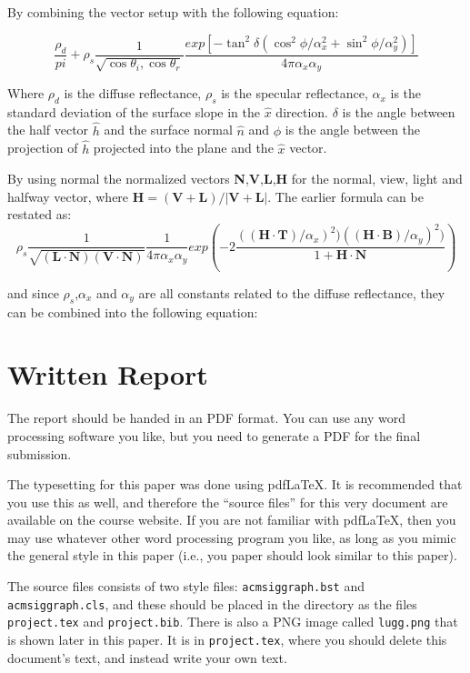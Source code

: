 \documentclass{acmsiggraph}               %
\begin{document}
By combining the vector setup with the following equation:

\begin{equation}
  \frac{\rho_d}{pi} + \rho_s \frac{1}{\sqrt{\cos{\theta_i},\cos{\theta_r}}}
  \frac{exp[-\tan^2\delta(\cos^2\phi/\alpha_x^2 +
  \sin^2\phi/\alpha_y^2)]}{4\pi\alpha_x\alpha_y}
\end {equation}

Where $\rho_d$ is the diffuse reflectance, $\rho_s$ is the specular
reflectance, $\alpha_x$ is the standard deviation of the surface slope in the
$\hat{x}$ direction. $\delta$ is the angle between the half vector $\hat{h}$
and the surface normal $\hat{n}$ and $\phi$ is the angle between the projection
of $\hat{h}$ projected into the plane and the $\hat{x}$ vector.

By using normal the normalized vectors \textbf{N},\textbf{V},\textbf{L},\textbf{H} for the
normal, view, light and halfway vector, where $\textbf{H} =
(\textbf{V}+\textbf{L})/|\textbf{V}+\textbf{L}|$. The earlier formula can be
restated as:
\begin{equation}
  \rho_s \frac{1}{\sqrt{(\textbf{L}\cdot\textbf{N})(\textbf{V}\cdot\textbf{N})}}
  \frac{1}{4\pi\alpha_x\alpha_y} exp (-2\frac{((\textbf{H}\cdot\textbf{T})/\alpha_x)^2)
((\textbf{H}\cdot\textbf{B})/\alpha_y)^2)} {1 + \textbf{H}\cdot\textbf{N}})
\end {equation}

and since $\rho_s$,$\alpha_x$ and $\alpha_y$ are all constants related to the
diffuse reflectance, they can be combined into the following equation:

\section{Written Report}

The report should be handed in an PDF format. You can use any word processing software you like, but you need to generate a PDF for the final submission.

The typesetting for this paper was done using pdf\LaTeX. It is recommended that you
use this as well, and therefore the ``source files'' for this very document are
available on the course website. If you are not familiar with pdf\LaTeX, then
you may use whatever other word processing program you like, as long as you mimic
the general style in this paper (i.e., you paper should look similar to
this paper).

The source files consists of two style files: \texttt{acmsiggraph.bst}
and \texttt{acmsiggraph.cls}, and these should be placed in the directory as the
files \texttt{project.tex} and \texttt{project.bib}. There is also a PNG image called
\texttt{lugg.png} that is shown later in this paper.
It is in \texttt{project.tex}, where you should delete this document's text,
and instead write your own text.
\end{document}
